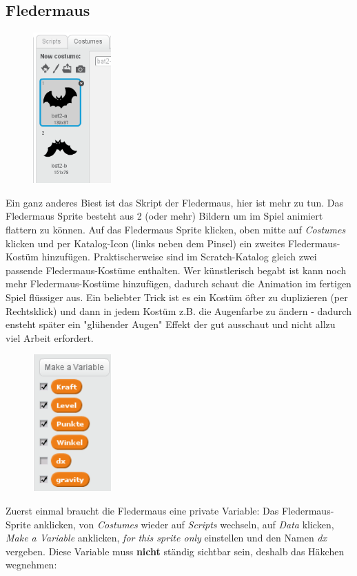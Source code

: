 \documentclass[10pt,a4paper,ngerman,twoside]{article} %
\begin{document}
\begin{multicols}{3}
\subsection*{Fledermaus}
\begin{figure}
\includegraphics[width=3cm]{scratch/animation.png}
\end{figure}
Ein ganz anderes Biest ist das Skript der Fledermaus, hier ist mehr zu tun. Das Fledermaus Sprite besteht aus 2 (oder mehr) Bildern um im Spiel animiert flattern zu können. Auf das Fledermaus Sprite klicken, oben mitte auf \textit{Costumes} klicken und per Katalog-Icon (links neben dem Pinsel) ein zweites Fledermaus-Kostüm hinzufügen. Praktischerweise sind im Scratch-Katalog gleich zwei passende Fledermaus-Kostüme enthalten. Wer künstlerisch begabt ist kann noch mehr Fledermaus-Kostüme hinzufügen, dadurch schaut die Animation im fertigen Spiel flüssiger aus. Ein beliebter Trick ist es ein Kostüm öfter zu duplizieren (per Rechtsklick) und dann in jedem Kostüm z.B. die Augenfarbe zu ändern - dadurch ensteht später ein "glühender Augen" Effekt der gut ausschaut und nicht allzu viel Arbeit erfordert. 

\begin{figure}
\includegraphics[width=3cm]{scratch/fbatvars.png}
\end{figure}
Zuerst einmal braucht die Fledermaus eine private Variable: Das Fledermaus-Sprite anklicken, von \textit{Costumes} wieder auf \textit{Scripts} wechseln,  auf \textit{Data} klicken, \textit{Make a Variable} anklicken, \textit{for this sprite only} einstellen und den Namen \textit{dx} vergeben. Diese Variable muss \textbf{nicht} ständig sichtbar sein, deshalb das Häkchen wegnehmen:


\end{multicols}
\end{document}
